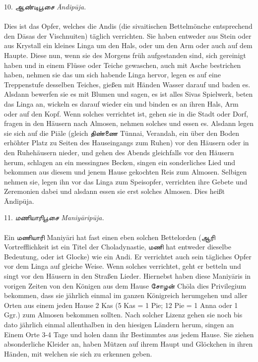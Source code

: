 \documentclass{article}
\newcommand{\TamilText}[1]{\texttamil{#1}}
\newcommand{\tam}[1]{\TamilText{#1}}
\begin{document}
\begin{center}
10. \emph{\tam{ஆண்டிபூசை} \={A}ndip\={u}ja.}
\end{center}
\paragraph{}
Dies ist das Opfer, welches die Andis (die sivaitischen Bettelmönche entsprechend den D\={a}sas der Vischnuiten) täglich verrichten. Sie haben entweder aus Stein oder aus Krystall ein kleines Linga um den Hals, oder um den Arm oder auch auf dem Haupte. Diese nun, wenn sie des Morgens früh aufgestanden sind, sich gereinigt haben und in einem Flüsse oder Teiche gewaschen, auch mit Asche bestrichen haben, nehmen sie das um sich habende Linga hervor, legen es auf eine Treppenstufe desselben Teiches, gießen mit Händen Wasser darauf und baden es. Alsdann bewerfen sie es mit Blumen und sagen, es ist alles Sivas Spielwerk, beten das Linga an, wickeln es darauf wieder ein und binden es an ihren Hals, Arm oder auf den Kopf. Wenn solches verrichtet ist, gehen sie in die Stadt oder Dorf, fragen in den Häusern nach Almosen, nehmen solches und essen es. Alsdann legen sie sich auf die Pi\={a}le (gleich \tam{திண்ணை} Tünnai, Verandah, ein über den Boden erhöhter Platz zu Seiten des Hauseingangs zum Ruhen) vor den Häusern oder in den Ruhehäusern nieder, und gehen des Abends gleichfalls vor den Häusern herum, schlagen an ein messingnes Becken, singen ein sonderliches Lied und bekommen aus diesem und jenem Hause gekochten Reis zum Almosen. Selbigen nehmen sie, legen ihn vor das Linga zum Speisopfer, verrichten ihre Gebete und Zeremonien dabei und alsdann essen sie erst solches Almosen. Dies heißt \={A}ndip\={u}ja.

\begin{center}
11. \emph{\tam{மணியாரிபூசை} Maniy\={a}rip\={u}ja.}
\end{center}
\paragraph{}
Ein \tam{மணியாரி} Maniy\={a}ri hat fast einen eben solchen Bettelorden (\tam{ஆரி} Vortrefflichkeit ist ein Titel der Choladynastie, \tam{மணி} hat entweder dieselbe Bedeutung, oder ist Glocke) wie ein Andi. Er verrichtet auch sein tägliches Opfer vor dem Linga auf gleiche Weise. Wenn solches verrichtet, geht er betteln und singt vor den Häusern in den Straßen Lieder. Hiernebst haben diese Maniy\={a}ris in vorigen Zeiten von den Königen aus dem Hause \tam{சோழன்} Ch\={o}la dies Privilegium bekommen, dass sie jährlich einmal im ganzen Königreich herumgehen und aller Orten aus einem jeden Hause 2 Kas (5 Kas = 1 Pie; 12 Pie = 1 Anna oder 1 Ggr.) zum Almosen bekommen sollten. Nach solcher Lizenz gehen sie noch bis dato jährlich einmal allenthalben in den hiesigen Ländern herum, singen an Einem Orte 3-4 Tage und holen dann ihr Bestimmtes aus jedem Hause. Sie ziehen absonderliche Kleider an, haben Mützen auf ihrem Haupt und Glöckchen in ihren Händen, mit welchen sie sich zu erkennen geben.
\end{document}
